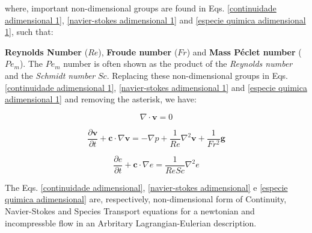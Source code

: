 \noindent
where, important non-dimensional groups are found in
Eqs. \ref{continuidade adimensional 1}, \ref{navier-stokes adimensional 1}
and \ref{especie quimica adimensional 1}, such that:
\item \textbf{Reynolds Number} ($Re$),
\textbf{Froude number} ($Fr$) and
\textbf{Mass Péclet number} ($Pe_{m}$).
The $Pe_{m}$ number is often
 shown as the product of
 the \textit{Reynolds number} and the \textit{Schmidt number} $Sc$.
Replacing these non-dimensional groups in Eqs.
\ref{continuidade adimensional 1}, \ref{navier-stokes adimensional 1}
and \ref{especie quimica adimensional 1} and
removing the asterisk, we have:

\begin{equation} \label{continuidade adimensional}
 \nabla \cdot \textbf{v} = 0
\end{equation}

\begin{equation} \label{navier-stokes adimensional}
 \frac{\partial \textbf{v}}{\partial t} 
 + 
 \textbf{c} \cdot \nabla \textbf{v}
 =
 -
 \nabla p
 +
 \frac{1}{Re} \nabla^{2} \textbf{v}
 +
 \frac{1}{Fr^{2}} \textbf{g}
\end{equation}

\begin{equation} \label{especie quimica adimensional}
 \frac{\partial e}{\partial t}
 +
 \textbf{c} \cdot \nabla e
 =
 \frac{1}{ReSc} \nabla^{2} e
\end{equation}

\medskip
The Eqs.
\ref{continuidade adimensional}, 
\ref{navier-stokes adimensional} e 
\ref{especie quimica adimensional}
are, respectively, non-dimensional form of Continuity,
Navier-Stokes and Species Transport equations
for a newtonian and incompressble flow in an
Arbritary Lagrangian-Eulerian description.

